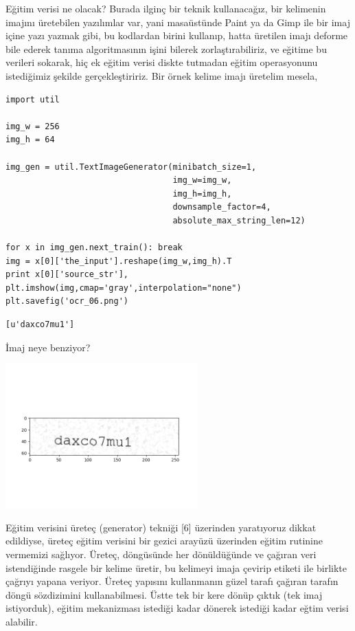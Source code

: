 \documentclass[12pt,fleqn]{article}\usepackage{../../common}
\begin{document}
\inputminted[fontsize=\footnotesize]{python}{train.py}

Eğitim verisi ne olacak? Burada ilginç bir teknik kullanacağız, bir
kelimenin imajını üretebilen yazılımlar var, yani masaüstünde Paint ya da
Gimp ile bir imaj içine yazı yazmak gibi, bu kodlardan birini kullanıp,
hatta üretilen imajı deforme bile ederek tanıma algoritmasının işini
bilerek zorlaştırabiliriz, ve eğitime bu verileri sokarak, hiç ek eğitim
verisi diskte tutmadan eğitim operasyonunu istediğimiz şekilde
gerçekleştiririz. Bir örnek kelime imajı üretelim mesela,

\begin{verbatim}
import util

img_w = 256
img_h = 64

img_gen = util.TextImageGenerator(minibatch_size=1,
                                  img_w=img_w,
                                  img_h=img_h,
                                  downsample_factor=4,
                                  absolute_max_string_len=12)

for x in img_gen.next_train(): break
img = x[0]['the_input'].reshape(img_w,img_h).T
print x[0]['source_str'],
plt.imshow(img,cmap='gray',interpolation="none")
plt.savefig('ocr_06.png')    
\end{verbatim}

\begin{verbatim}
[u'daxco7mu1']
\end{verbatim}

İmaj neye benziyor?

\includegraphics[width=20em]{ocr_06.png}

Eğitim verisini üreteç (generator) tekniği [6] üzerinden yaratıyoruz dikkat
edildiyse, üreteç eğitim verisini bir gezici arayüzü üzerinden eğitim
rutinine vermemizi sağlıyor. Üreteç, döngüsünde her dönüldüğünde ve çağıran
veri istendiğinde rasgele bir kelime üretir, bu kelimeyi imaja çevirip
etiketi ile birlikte çağrıyı yapana veriyor. Üreteç yapısını kullanmanın
güzel tarafı çağıran tarafın döngü sözdizimini kullanabilmesi. Üstte tek
bir kere dönüp çıktık (tek imaj istiyorduk), eğitim mekanizması istediği
kadar dönerek istediği kadar eğtim verisi alabilir.
\end{document}
